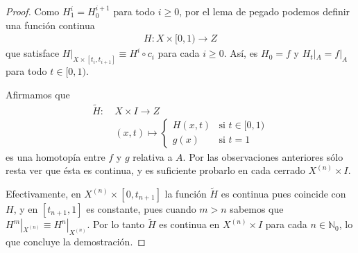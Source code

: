 \documentclass[11pt]{article}
\newcommand{\N}{\mathbb{N}}
\begin{document}
\begin{proof}
Como $H^i_1 = H_0^{i+1}$ para todo $i \geq 0$, por el lema de pegado podemos definir una función continua
\begin{align*}
H : X \times [0,1) \to Z
\end{align*}
que satisface $H|_{X \times [t_i,t_{i+1}]} \equiv H^i \circ c_i$ para cada $i \geq 0$. Así, es $H_0 = f$ y $H_t|_A = f|_A$ para todo $t \in [0,1)$.

Afirmamos que 
\begin{align*}
\tilde{H}:\ & X \times I \longrightarrow Z\\
&(x,t) \mapsto \begin{cases}
H(x,t) &\text{si $t\in [0,1)$}\\
g(x) &\text{si $t = 1$}
\end{cases}
\end{align*}
es una homotopía entre $f$ y $g$ relativa a $A$. Por las observaciones anteriores sólo resta ver que ésta es continua, y es suficiente probarlo en cada cerrado $X^{(n)} \times I$. 

Efectivamente, en $X^{(n)} \times [0,t_{n+1}]$ la función $\tilde{H}$ es continua pues coincide con $H$, y en $[t_{n+1}, 1]$ es constante, pues cuando $m > n$ sabemos que $H^m|_{X^{(n)}} \equiv H^n|_{X^{(n)}}$. Por lo tanto $\tilde{H}$ es continua en $X^{(n)} \times I$ para cada $n \in \N_0$, lo que concluye la demostración. 
\end{proof}
\end{document}
